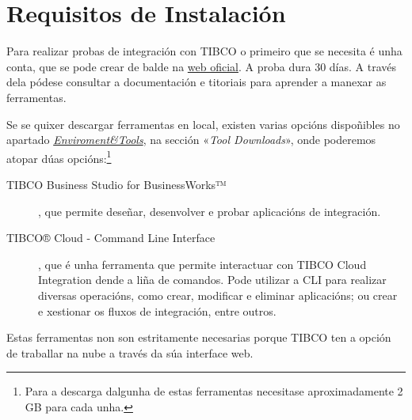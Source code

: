 \chapter{Requisitos de Instalación}
\label{chap:requisitos}

Para realizar probas de integración con TIBCO o primeiro que se necesita é unha conta, que se pode crear de balde na \href{https://account.cloud.tibco.com/signup/tci}{web oficial}. A proba dura 30 días. A través dela pódese consultar a documentación e titoriais para aprender a manexar as ferramentas.

Se se quixer descargar ferramentas en local, existen varias opcións dispoñibles no apartado \textit{\href{https://eu.integration.cloud.tibco.com/envtools}{Enviroment\&Tools}}, na sección «\textit{Tool Downloads}», onde poderemos atopar dúas opcións:\footnote{Para a descarga dalgunha de estas ferramentas necesitase aproximadamente 2 GB para cada unha.}

\begin{description}
    \item[TIBCO Business Studio for BusinessWorks™], que permite deseñar, desenvolver e probar aplicacións de integración.
    \item[TIBCO® Cloud - Command Line Interface], que é unha ferramenta que permite interactuar con TIBCO Cloud Integration dende a liña de comandos. Pode utilizar a CLI para realizar diversas operacións, como crear, modificar e eliminar aplicacións; ou crear e xestionar os fluxos de integración, entre outros.
\end{description}

Estas ferramentas non son estritamente necesarias porque TIBCO ten a opción de traballar na nube a través da súa interface web.